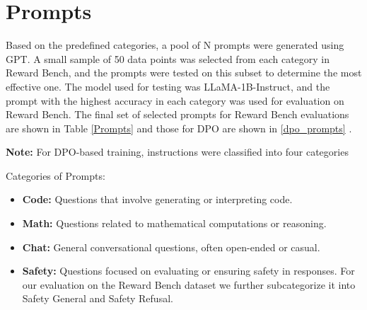 \section{Prompts}
\label{Prompts_table}
Based on the predefined categories, a pool of N prompts were generated using GPT. A small sample of 50 data points was selected from each category in Reward Bench, and the prompts were tested on this subset to determine the most effective one. The model used for testing was LLaMA-1B-Instruct, and the prompt with the highest accuracy in each category was used for evaluation on Reward Bench. The final set of selected prompts for Reward Bench evaluations are shown in Table \ref{Prompts} and those for DPO are shown in \ref{dpo_prompts} .

\textbf{Note:} For DPO-based training, instructions were classified into four categories

Categories of Prompts: 
\begin{itemize}
  \setlength{\itemsep}{0.05em} %
  \item \textbf{Code:} Questions that involve generating or interpreting code.
  \item \textbf{Math:} Questions related to mathematical computations or reasoning.
  \item \textbf{Chat:} General conversational questions, often open-ended or casual.
  \item \textbf{Safety:} Questions focused on evaluating or ensuring safety in responses.
  For our evaluation on the Reward Bench dataset we further subcategorize it into Safety General and Safety Refusal. 
\end{itemize}


